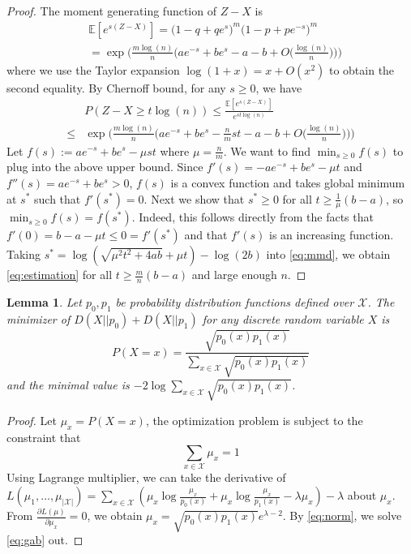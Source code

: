 \documentclass[conference]{IEEEtran}
\newtheorem{lemma}{Lemma}
\begin{document}
\begin{proof}
    The moment generating function of $Z-X$ is
    \begin{align*}
    &\mathbb{E}[e^{s(Z-X)}]  = 
    \Big(1-q+q e^s \Big)^{m}
    \Big(1-p+pe^{-s} \Big)^{m}  \\
    & = 
    \exp\Big(\frac{m\log(n)}{n} \Big( a e^{-s}+b e^s-a-b + O\big(\frac{\log(n)}{n}\big) \Big)\Big)
    \end{align*}
    where we use the Taylor expansion $\log(1+x)=x+O(x^2)$ to obtain the second equality.
    By Chernoff bound, for any $s\ge 0$, we have
    \begin{equation} \label{eq:mmd}
    \begin{aligned}
    & P(Z-X \geq t\log(n))\leq
    \frac{\mathbb{E}[e^{s(Z-X)}]}{e^{st\log(n)}}  \\
    \le & \exp\Big(\frac{m\log(n)}{n} \Big( a e^{-s}+b e^s -\frac{n}{m}st -a-b + O\big(\frac{\log(n)}{n}\big) \Big)\Big)
    \end{aligned}
    \end{equation}
    Let $f(s):=a e^{-s}+be^s-\mu st$ where $\mu=\frac{n}{m}$. We want to find $\min_{s\ge 0}f(s)$ to plug into the above upper bound. Since 
    $f'(s)=-ae^{-s}+be^s-\mu t$ and 
    $f''(s)=ae^{-s}+be^s>0$, $f(s)$ is a convex function and takes global minimum at $s^\ast$ such that $f'(s^\ast)=0$. Next we show that $s^\ast\ge 0$ for all $t\ge \frac{1}{\mu}(b-a)$, so $\min_{s\ge 0}f(s)=f(s^\ast)$. Indeed, this follows directly from the facts that $f'(0)=b-a-\mu t\le 0=f'(s^\ast)$ and that $f'(s)$ is an increasing function. Taking $s^\ast=\log(\sqrt{\mu^2 t^2+4ab}+\mu t)-\log(2b)$ into \eqref{eq:mmd}, we obtain \eqref{eq:estimation} for all $t \geq \frac{m}{n}(b-a) $ and large enough $n$.
\end{proof}
\begin{lemma}\label{lem:p0p12}
	Let $p_0, p_1$ be probability distribution functions defined over $\mathcal{X}$. The minimizer
	of $D(X||p_0) + D(X||p_1)$ for any discrete random variable $X$ is
	\begin{equation}\label{eq:p012}
	P(X=x)=\frac{\sqrt{p_0(x)p_1(x)}}{ \sum_{x\in \mathcal{X}} \sqrt{p_0(x) p_1(x)}}
	\end{equation}
	and the minimal value is
	$-2\log \sum_{x\in \mathcal{X}} \sqrt{p_0(x) p_1(x)}$.
\end{lemma}
\begin{proof}
	Let $\mu_x = P(X=x)$, the optimization problem is subject to the constraint that
	\begin{equation}\label{eq:norm}
	\sum_{x \in \mathcal{X}} \mu_x = 1
	\end{equation}
	Using Lagrange multiplier, we can take
	the derivative of $L(\mu_1, \dots, \mu_{|\mathcal{X}|})=\sum_{x \in \mathcal{X}}
	(\mu_x\log \frac{\mu_x}{p_0(x)} +\mu_x \log \frac{\mu_x}{p_1(x)}
	-\lambda\mu_x) -\lambda$ about $\mu_x$.
	From $\frac{\partial L(\mu)}{\partial \mu_x} = 0$, we obtain $\mu_x = \sqrt{p_0(x)p_1(x)}e^{\lambda-2}$.
	By \eqref{eq:norm}, we solve \eqref{eq:gab} out.	
\end{proof}
\end{document}
